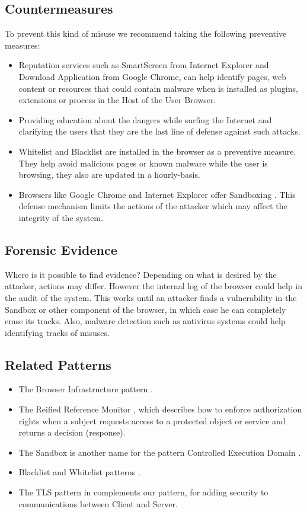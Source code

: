 \documentclass{sig-alternate-05-2015}
\begin{document}
\subsection*{Countermeasures} 
  To prevent this kind of misuse we recommend taking the following preventive measures:
  \begin{itemize}
    \item Reputation services such as SmartScreen \cite{Colvin2010} from Internet Explorer and Download Application \cite{Rajab2013} from Google Chrome, can help identify pages, web content or resources that could contain malware when is installed as plugins, extensions or process in the Host of the User Browser.
    \item Providing education about the dangers while surfing the Internet and clarifying the users that they are the last line of defense against such attacks.
    \item Whitelist and Blacklist are installed in the browser as a preventive measure. They help avoid malicious pages or known malware while the user is browsing, they also are updated in a hourly-basis.
    \item Browsers like Google Chrome and Internet Explorer offer Sandboxing \cite{sandboxGC,Yason}. This defense mechanism limits the actions of the attacker which may affect the integrity of the system.
  \end{itemize}

\subsection*{Forensic Evidence}
  Where is it possible to find evidence? Depending on what is desired by the attacker, actions may differ. However the internal log of the browser could help in the audit of the system. This works until an attacker finds a vulnerability in the Sandbox or other component of the browser, in which case he can completely erase its tracks. Also, malware detection such as antivirus systems could help identifying tracks of misuses.

\subsection*{Related Patterns}
  \begin{itemize}
    \item The Browser Infrastructure pattern \cite{silva2015}.
    \item The Reified Reference Monitor \cite{fernandez2013security}, which describes how to enforce authorization rights when a subject requests access to a protected object or service and returns a decision (response). 
    \item The Sandbox is another name for the pattern Controlled Execution Domain \cite{fernandez2013security}.
    \item Blacklist and Whitelist patterns \cite{fernandez2013security}.
    \item The TLS pattern in \cite{fernandez2013security} complements our pattern, for adding security to communications between Client and Server.
  \end{itemize}
\end{document}
